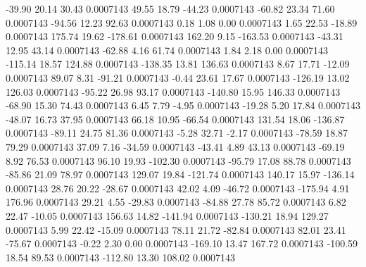       -39.90       20.14       30.43     0.0007143
       49.55       18.79      -44.23     0.0007143
      -60.82       23.34       71.60     0.0007143
      -94.56       12.23       92.63     0.0007143
        0.18        1.08        0.00     0.0007143
        1.65       22.53      -18.89     0.0007143
      175.74       19.62     -178.61     0.0007143
      162.20        9.15     -163.53     0.0007143
      -43.31       12.95       43.14     0.0007143
      -62.88        4.16       61.74     0.0007143
        1.84        2.18        0.00     0.0007143
     -115.14       18.57      124.88     0.0007143
     -138.35       13.81      136.63     0.0007143
        8.67       17.71      -12.09     0.0007143
       89.07        8.31      -91.21     0.0007143
       -0.44       23.61       17.67     0.0007143
     -126.19       13.02      126.03     0.0007143
      -95.22       26.98       93.17     0.0007143
     -140.80       15.95      146.33     0.0007143
      -68.90       15.30       74.43     0.0007143
        6.45        7.79       -4.95     0.0007143
      -19.28        5.20       17.84     0.0007143
      -48.07       16.73       37.95     0.0007143
       66.18       10.95      -66.54     0.0007143
      131.54       18.06     -136.87     0.0007143
      -89.11       24.75       81.36     0.0007143
       -5.28       32.71       -2.17     0.0007143
      -78.59       18.87       79.29     0.0007143
       37.09        7.16      -34.59     0.0007143
      -43.41        4.89       43.13     0.0007143
      -69.19        8.92       76.53     0.0007143
       96.10       19.93     -102.30     0.0007143
      -95.79       17.08       88.78     0.0007143
      -85.86       21.09       78.97     0.0007143
      129.07       19.84     -121.74     0.0007143
      140.17       15.97     -136.14     0.0007143
       28.76       20.22      -28.67     0.0007143
       42.02        4.09      -46.72     0.0007143
     -175.94        4.91      176.96     0.0007143
       29.21        4.55      -29.83     0.0007143
      -84.88       27.78       85.72     0.0007143
        6.82       22.47      -10.05     0.0007143
      156.63       14.82     -141.94     0.0007143
     -130.21       18.94      129.27     0.0007143
        5.99       22.42      -15.09     0.0007143
       78.11       21.72      -82.84     0.0007143
       82.01       23.41      -75.67     0.0007143
       -0.22        2.30        0.00     0.0007143
     -169.10       13.47      167.72     0.0007143
     -100.59       18.54       89.53     0.0007143
     -112.80       13.30      108.02     0.0007143
